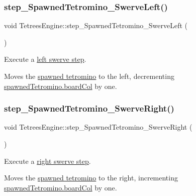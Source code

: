 \subsubsection{\texorpdfstring{step\+\_\+\+Spawned\+Tetromino\+\_\+\+Swerve\+Left()}{step\_SpawnedTetromino\_SwerveLeft()}}
{\footnotesize\ttfamily void Tetrees\+Engine\+::step\+\_\+\+Spawned\+Tetromino\+\_\+\+Swerve\+Left (\begin{DoxyParamCaption}{ }\end{DoxyParamCaption})\hspace{0.3cm}{\ttfamily [private]}}



Execute a \hyperlink{TetreesDefs_8hpp_a4d5a793092a473f85b4c1f7faf62afeda3b27946656fc3bf9470a8b7761cfa8e1}{left swerve step}. 

Moves the \hyperlink{classTetreesEngine_a26435ee2f02d9ba70d9e359745114f6e}{spawned tetromino} to the left, decrementing \hyperlink{structpiece__t}{spawned\+Tetromino.board\+Col} by one. \mbox{\label{classTetreesEngine_a46e1950877c8b8aa7e988ca3de14ad18}} 
\subsubsection{\texorpdfstring{step\+\_\+\+Spawned\+Tetromino\+\_\+\+Swerve\+Right()}{step\_SpawnedTetromino\_SwerveRight()}}
{\footnotesize\ttfamily void Tetrees\+Engine\+::step\+\_\+\+Spawned\+Tetromino\+\_\+\+Swerve\+Right (\begin{DoxyParamCaption}{ }\end{DoxyParamCaption})\hspace{0.3cm}{\ttfamily [private]}}



Execute a \hyperlink{TetreesDefs_8hpp_a4d5a793092a473f85b4c1f7faf62afeda86fdea6e730f10b7d265b067552624d3}{right swerve step}. 

Moves the \hyperlink{classTetreesEngine_a26435ee2f02d9ba70d9e359745114f6e}{spawned tetromino} to the right, incrementing \hyperlink{structpiece__t}{spawned\+Tetromino.board\+Col} by one. \mbox{\label{classTetreesEngine_a446196c2260e2ce2ac0d18848ee6b636}} 
